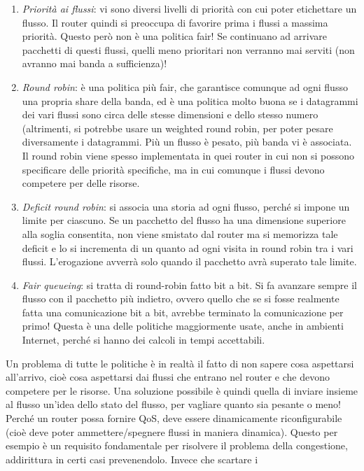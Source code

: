 \begin{enumerate}
 \item \textit{Priorità ai flussi}: vi sono diversi livelli di priorità con cui
poter etichettare un flusso. Il router
 quindi si preoccupa di favorire prima i flussi a massima priorità. Questo però
non è una politica fair! Se continuano
 ad arrivare pacchetti di questi flussi, quelli meno prioritari non verranno mai
serviti (non avranno mai banda a
 sufficienza)!
 \item \textit{Round robin}: è una politica più fair, che garantisce comunque ad
ogni flusso una propria share della
 banda, ed è una politica molto buona se i datagrammi dei vari flussi sono circa
delle stesse dimensioni e dello stesso numero (altrimenti,
 si potrebbe usare un weighted round robin, per poter pesare diversamente i
datagrammi. Più un flusso è pesato,
 più banda vi è associata. Il round  robin viene spesso implementata in quei
router in cui non si possono specificare delle priorità specifiche, ma in cui
comunque i flussi devono competere per delle risorse.
 \item \textit{Deficit round robin}: si associa una storia ad ogni flusso,
perché si impone un limite per ciascuno.
 Se un pacchetto del flusso ha una dimensione superiore alla soglia consentita,
non viene smistato dal router ma si memorizza tale deficit e lo si incrementa di
un quanto ad ogni visita in round robin tra i vari flussi. L'erogazione avverrà
solo quando il pacchetto avrà superato tale limite.
 \item \textit{Fair queueing}: si tratta di round-robin fatto bit a bit. Si fa
avanzare sempre il flusso con il
 pacchetto più indietro, ovvero quello che se si fosse realmente fatta una
comunicazione bit a bit, avrebbe terminato
 la comunicazione per primo! Questa è una delle politiche maggiormente usate,
anche in ambienti Internet, perché si
 hanno dei calcoli in tempi accettabili.
\end{enumerate}
Un problema di tutte le politiche è in realtà il fatto di non sapere cosa
aspettarsi all'arrivo, cioè cosa aspettarsi
dai flussi che entrano nel router e che devono competere per le risorse. Una
soluzione possibile è quindi quella di
inviare insieme al flusso un'idea dello stato del flusso, per vagliare quanto
sia pesante o meno!
Perché un router possa fornire QoS, deve essere dinamicamente riconfigurabile
(cioè deve poter ammettere/spegnere
flussi in maniera dinamica). Questo per esempio è un requisito fondamentale per
risolvere il problema della
congestione, addirittura in certi casi prevenendolo. Invece che scartare i
